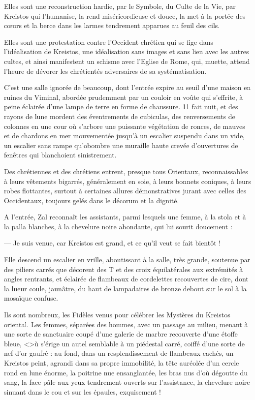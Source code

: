 \documentclass[a4paper, 11pt, oneside, polutonikogreek, french]{article}
\begin{document}
Elles sont une reconstruction hardie, par le Symbole, du Culte de la Vie, par Kreistos qui l'humanise, la rend miséricordieuse et douce, la met à la portée des cœurs et la berce dans les larmes tendrement apparues au feuil des cils.

Elles sont une protestation contre l'Occident chrétien qui se fige dans l'idéalisation de Kreistos, une idéalisation sans images et sans lien avec les autres cultes, et ainsi manifestent un schisme avec l'Eglise de Rome, qui, muette, attend l'heure de dévorer les chrétientés adversaires de sa systématisation.

C'est une salle ignorée de beaucoup, dont l'entrée expire au seuil d'une maison en ruines du Viminal, abordée prudemment par un couloir en voûte qui s'effrite, à peine éclairée d'une lampe de terre en forme de chaussure. 11 fait nuit, et des rayons de lune mordent des éventrements de cubiculas, des renversements de colonnes en une cour où s'arbore une puissante végétation de ronces, de mauves et de chardons en mer mouvementée jusqu'à un escalier suspendu dans un vide, un escalier sans rampe qu'obombre une muraille haute crevée d'ouvertures de fenêtres qui blanchoient sinistrement.

Des chrétiennes et des chrétiens entrent, presque tous Orientaux, reconnaissables à leurs vêtements bigarrés, généralement en soie, à leurs bonnets coniques, à leurs robes flottantes, surtout à certaines allures démonstratives jurant avec celles des Occidentaux, toujours gelés dans le décorum et la dignité.

A l'entrée, Zal reconnaît les assistants, parmi lesquels une femme, à la stola et à la palla blanches, à la chevelure noire abondante, qui lui sourit doucement :

--- Je suis venue, car Kreistos est grand, et ce qu'il veut se fait bientôt !

Elle descend un escalier en vrille, aboutissant à la salle, très grande, soutenue par des piliers carrés que décorent des T et des croix équilatérales aux extrémités à angles rentrants, et éclairée de flambeaux de cordelettes recouvertes de cire, dont la lueur coule, jaunâtre, du haut de lampadaires de bronze debout sur le sol à la mosaïque confuse.

Ils sont nombreux, les Fidèles venus pour célébrer les Mystères du Kreistos oriental. Les femmes, séparées des hommes, avec un passage au milieu, menant à une sorte de sanctuaire coupé d'une galerie de marbre recouverte d'une étoffe bleue, <>ù s'érige un autel semblable à un piédestal carré, coiffé d'une sorte de nef d'or gaufré : au fond, dans un resplendissement de flambeaux cachés, un Kreistos peint, agrandi dans sa propre immobilité, la tête auréolée d'un cercle rond en lune énorme, la poitrine nue ensanglantée, les bras nus d'où dégoutte du sang, la face pâle aux yeux tendrement ouverts sur l'assistance, la chevelure noire sinuant dans le cou et sur les épaules, exquisement !
\end{document}
